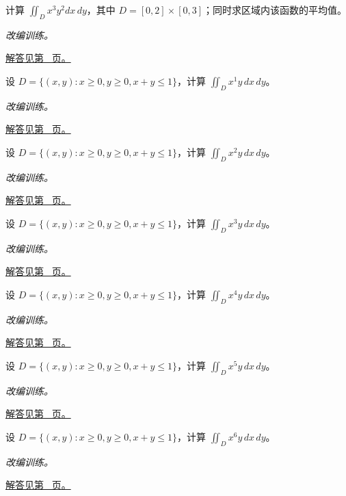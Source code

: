 \documentclass[UTF8,12pt,a4paper,fontset=fandol]{ctexart}
\begin{document}
\begin{example}[矩形区域上的乘积分离]\label{ex:c36q7}
计算 $\displaystyle\iint_Dx^{3}y^{2}dx\,dy$，其中 $D=[0,2]\times[0,3]$；同时求区域内该函数的平均值。
\par\textit{改编训练。}\par\hyperref[ans:c36q7]{解答见第~\pageref{ans:c36q7} 页。}
\end{example}
\begin{example}[三角形上的累次积分]\label{ex:c36q8}
设 $D=\{(x,y):x\ge0,y\ge0,x+y\le1\}$，计算 $\displaystyle\iint_Dx^{1}y\,dx\,dy$。
\par\textit{改编训练。}\par\hyperref[ans:c36q8]{解答见第~\pageref{ans:c36q8} 页。}
\end{example}
\begin{example}[三角形上的累次积分]\label{ex:c36q9}
设 $D=\{(x,y):x\ge0,y\ge0,x+y\le1\}$，计算 $\displaystyle\iint_Dx^{2}y\,dx\,dy$。
\par\textit{改编训练。}\par\hyperref[ans:c36q9]{解答见第~\pageref{ans:c36q9} 页。}
\end{example}
\begin{example}[三角形上的累次积分]\label{ex:c36q10}
设 $D=\{(x,y):x\ge0,y\ge0,x+y\le1\}$，计算 $\displaystyle\iint_Dx^{3}y\,dx\,dy$。
\par\textit{改编训练。}\par\hyperref[ans:c36q10]{解答见第~\pageref{ans:c36q10} 页。}
\end{example}
\begin{example}[三角形上的累次积分]\label{ex:c36q11}
设 $D=\{(x,y):x\ge0,y\ge0,x+y\le1\}$，计算 $\displaystyle\iint_Dx^{4}y\,dx\,dy$。
\par\textit{改编训练。}\par\hyperref[ans:c36q11]{解答见第~\pageref{ans:c36q11} 页。}
\end{example}
\begin{example}[三角形上的累次积分]\label{ex:c36q12}
设 $D=\{(x,y):x\ge0,y\ge0,x+y\le1\}$，计算 $\displaystyle\iint_Dx^{5}y\,dx\,dy$。
\par\textit{改编训练。}\par\hyperref[ans:c36q12]{解答见第~\pageref{ans:c36q12} 页。}
\end{example}
\begin{example}[三角形上的累次积分]\label{ex:c36q13}
设 $D=\{(x,y):x\ge0,y\ge0,x+y\le1\}$，计算 $\displaystyle\iint_Dx^{6}y\,dx\,dy$。
\par\textit{改编训练。}\par\hyperref[ans:c36q13]{解答见第~\pageref{ans:c36q13} 页。}
\end{example}
\end{document}
